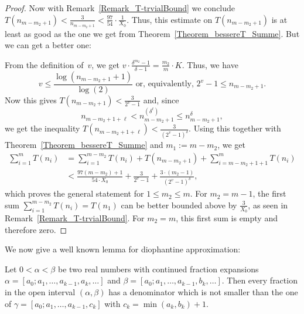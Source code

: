 \documentclass[12pt,reqno]{article}
\begin{document}
\begin{proof}
Now with Remark~\ref{Remark_T-trvialBound} we conclude $T(n_{m-m_2+1})<\tfrac{3}{n_{m-m_2+1}}<\tfrac{97}{54}\cdot \tfrac{1}{X_0}$. Thus, this estimate on $T(n_{m-m_2+1})$ is at least as good as the one we get from Theorem~\ref{Theorem_bessereT_Summe}. But we can get a better one:

From the definition of~$v$, we get  $v\cdot \tfrac{\delta^{m_2}-1}{\delta-1}=\tfrac{m_2}{m} \cdot K$. Thus, we have 
\[
v \leq \frac{\log(n_{m-m_2+1}+1)}{\log(2)} \text{ or, equivalently, } 2^v-1 \leq n_{m-m_2+1}.
\]
Now this gives $T(n_{m-m_2+1})<\tfrac{3}{2^v-1}$ and, since 
\[n_{m-m_2+1+\ell}<n_{m-m_2+1}^{(\delta^{\ell})}\leq n_{m-m_2+1}^{\delta},\] 
we get the inequality $T(n_{m-m_2+1+\ell})<\frac{3}{(2^v-1)^{\delta}}$.
Using this together with Theorem~\ref{Theorem_bessereT_Summe} and $m_1:=m-m_2$, we get
\begin{align*}
\sum_{i=1}^m T(n_i) &= \sum_{i=1}^{m-m_2} T(n_i) + T(n_{m-m_2+1}) + \sum_{i=m-m_2+1+1}^m T(n_i)\\
\quad &< \frac{97(m-m_2)+1}{54\cdot X_0} + \frac{3}{2^v-1} + \frac{3 \cdot (m_2-1)}{(2^v-1)^{\delta}},
\end{align*}
which proves the general statement for $1\leq m_2\leq m$. For $m_2=m-1$, the first sum $\sum_{i=1}^{m-m_2} T(n_i)=T(n_1)$ can be better bounded above by $\tfrac{3}{X_0}$, as seen in Remark~\ref{Remark_T-trvialBound}. For $m_2=m$, this first sum is empty and therefore zero.
\end{proof}

We now give a well known lemma for diophantine approximation:

\begin{lemma}\label{Lemma16}
Let $0<\alpha<\beta$ be two real numbers with continued fraction expansions $\alpha=[a_0;a_1,\ldots,a_{k-1},a_k,\ldots]$ and $\beta=[a_0;a_1,\ldots,a_{k-1},b_k,\ldots]$.
Then every fraction in the open interval $(\alpha,\beta)$ has a denominator which is not smaller than the one of $\gamma=[a_0;a_1,\ldots,a_{k-1},c_k]$ with $c_k=\min(a_k,b_k)+1$.
\end{lemma}
\end{document}
